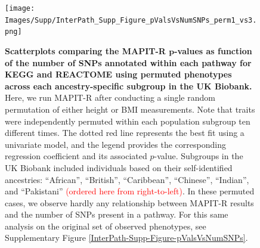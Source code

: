 \documentclass[10pt]{article}
\begin{document}
\begin{landscape}
\begin{figure}[htbp]
\centering
\vspace*{-2.2cm}
\texttt{[image: Images/Supp/InterPath\_Supp\_Figure\_pValsVsNumSNPs\_perm1\_vs3.png]}
\caption{\textbf{Scatterplots comparing the MAPIT-R $\bm{p}$-values as function of the number of SNPs annotated within each pathway for KEGG and REACTOME using permuted phenotypes across each ancestry-specific subgroup in the UK Biobank.} Here, we run MAPIT-R after conducting a single random permutation of either height or BMI measurements. Note that traits were independently permuted within each population subgroup ten different times. The dotted red line represents the best fit using a univariate model, and the legend provides the corresponding regression coefficient and its associated $p$-value. Subgroups in the UK Biobank included individuals based on their self-identified ancestries: ``African'', ``British'', ``Caribbean'', ``Chinese'', ``Indian'', and ``Pakistani'' \textcolor{red}{(ordered here from right-to-left)}. In these permuted cases, we observe hardly any relationship between MAPIT-R results and the number of SNPs present in a pathway. For this same analysis on the original set of observed phenotypes, see Supplementary Figure \ref{InterPath-Supp-Figure-pValsVsNumSNPs}.}
\label{InterPath-Supp-Figure-pValsVsNumSNPs-perm1}
\end{figure}
\clearpage
\end{landscape}

\end{document}
